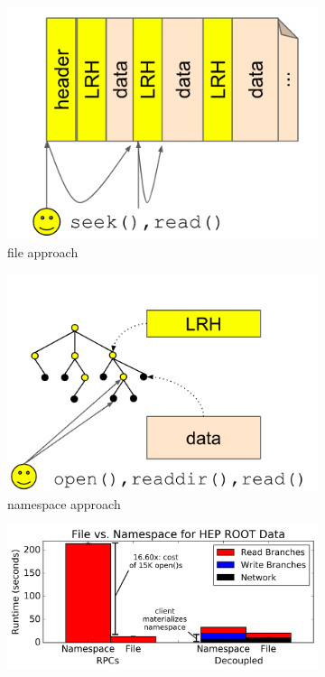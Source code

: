 \begin{figure}[tb]
    \centering
    \begin{subfigure}[b]{.25\linewidth}
      \centering
      \includegraphics[width=1.0\linewidth]{figures/tree_hep_a.png} 
      \caption{file approach}
      \label{fig:tree_hep_a}
    \end{subfigure}
    \begin{subfigure}[b]{.25\linewidth}
      \centering
      \includegraphics[width=1.0\linewidth]{figures/tree_hep_b.png} 
      \caption{namespace approach}
      \label{fig:tree_hep_b}
    \end{subfigure}
    \begin{subfigure}[b]{.4\linewidth}
      \centering
      \includegraphics[width=1\linewidth]{figures/hep_runtime.png}

\end{subfigure}
\end{figure}
